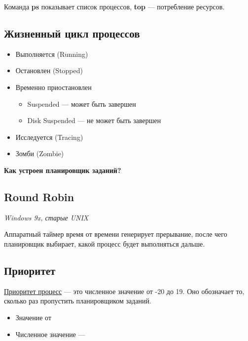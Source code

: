 \begin{multicols}{2}
    Команда \textbf{ps} показывает список процессов, \textbf{top} --- потребление ресурсов.
    
    \subsection*{Жизненный цикл процессов}
    
    \begin{itemize}
      \item Выполняется (Running)
      \item Остановлен (Stopped)
      \item Временно приостановлен
        \begin{itemize}
          \item Suspended --- может быть завершен
          \item Disk Suspended --- не может быть завершен
        \end{itemize}
      \item Исследуется (Tracing)
      \item Зомби (Zombie)
    \end{itemize}
    
    \textbf{Как устроен планировщик заданий?}
    
    \subsection*{Round Robin}
    \textit{Windows 9x, старые UNIX}
    
    Аппаратный таймер время от времени генерирует прерывание, после чего планировщик
    выбирает, какой процесс будет выполняться дальше.
    
    \subsection*{Приоритет}
    
    \begin{definition}{}{}
      \underline{Приоритет процесс} --- это численное значение от -20 до 19. 
      Оно обозначает то, сколько раз пропустить планировщиком заданий.
    \end{definition}
    
    \begin{itemize}
      \item Значение от 
      \item Численное значение --- 
    \end{itemize}
    

\end{multicols}
